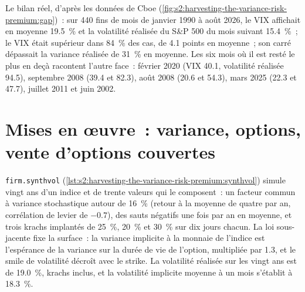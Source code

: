 Le bilan réel, d'après les données de Cboe (\cref{fig:s2:harvesting-the-variance-risk-premium:gap})~: sur 440 fins de mois de janvier 1990 à août 2026, le VIX
affichait en moyenne 19.5~\% et la volatilité réalisée du S\&P 500 du mois suivant 15.4~\%~; le VIX était supérieur dans 84~\% des cas, de 4.1 points en moyenne~; son
carré dépassait la variance réalisée de 31~\% en moyenne. Les six mois où il est resté le plus en deçà racontent l'autre face~: février 2020 (VIX 40.1, volatilité
réalisée 94.5), septembre 2008 (39.4 et 82.3), août 2008 (20.6 et 54.3), mars 2025 (22.3 et 47.7), juillet 2011 et juin 2002.

\begin{omfigure}

\label{fig:s2:harvesting-the-variance-risk-premium:gap}
\end{omfigure}

\section{Mises en œuvre~: variance, options, vente d'options couvertes}

\texttt{firm.synthvol} (\cref{lst:s2:harvesting-the-variance-risk-premium:synthvol}) simule vingt ans d'un indice et de trente valeurs qui le composent~: un facteur commun
à variance stochastique autour de 16~\% (retour à la moyenne de quatre par an, corrélation de levier de $-0.7$), des sauts négatifs une fois par an en moyenne, et
trois krachs implantés de 25~\%, 20~\% et 30~\% sur dix jours chacun. La loi sous-jacente fixe la surface~: la variance implicite à la monnaie de l'indice est l'espérance
de la variance sur la durée de vie de l'option, multipliée par 1.3, et le smile de volatilité décroît avec le strike. La volatilité réalisée sur les vingt ans est de 19.0~\%, krachs inclus, et
la volatilité implicite moyenne à un mois s'établit à 18.3~\%.


